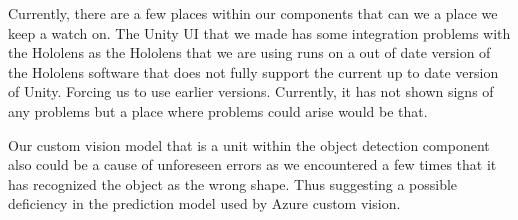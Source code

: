 \documentclass[12pt]{article}
\begin{document}
    Currently, there are a few places within our components that can we a place we keep a watch on. The Unity UI that we made has some integration problems with the Hololens as the Hololens that we are using runs on a out of date version of the Hololens software that does not fully support the current up to date version of Unity. Forcing us to use earlier versions. Currently, it has not shown signs of any problems but a place where problems could arise would be that. 

    Our custom vision model that is a unit within the object detection component also could be a cause of unforeseen errors as we encountered a few times that it has recognized the object as the wrong shape. Thus suggesting a possible deficiency in the prediction model used by Azure custom vision. 


    
    





\begingroup
\renewcommand{\section}[2]{}
\begin{thebibliography}{10}

\bigskip


\end{thebibliography}
\endgroup
\end{document}
